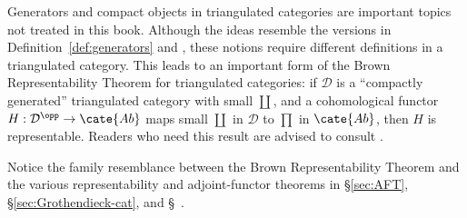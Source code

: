 \begin{remark}
	Generators and compact objects in triangulated categories are important
	topics not treated in this book. Although the ideas resemble the versions
	in Definition~\ref{def:generators} and
	, these notions require different
	definitions in a triangulated category. This leads to an important form
	of the Brown Representability Theorem for triangulated categories: if
	$\mathcal{D}$ is a “compactly generated” triangulated category with small
	$\coprod$, and a cohomological functor
	$H: \mathcal{D}^{\opp} \to \cate{Ab}$ maps small $\coprod$ in
	$\mathcal{D}$ to $\prod$ in $\cate{Ab}$, then $H$ is representable.
	Readers who need this result are advised to consult
	\cite[Tags 09SI, 09SM, 0A8E]{stacks}.

	Notice the family resemblance between the Brown Representability Theorem
	and the various representability and adjoint-functor theorems in
	\S\ref{sec:AFT}, \S\ref{sec:Grothendieck-cat}, and
	\S~.
\end{remark}
